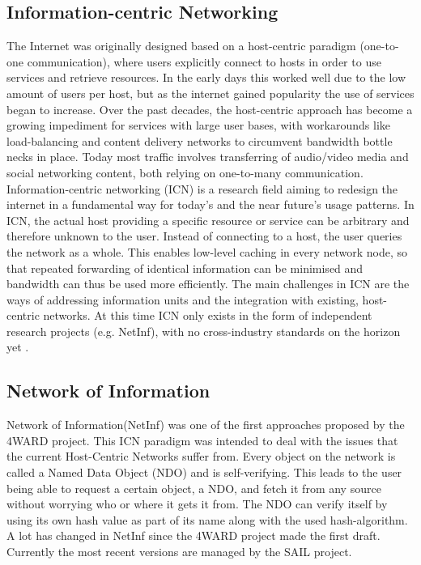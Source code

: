 \subsection{Information-centric Networking}
\label{sec:netinf}
The Internet was originally designed based on a host-centric paradigm 
(one-to-one communication), where users explicitly connect to hosts 
in order to use services and retrieve resources. In the early days 
this worked well due to the low amount of users per host, but as the 
internet gained popularity the use of services began to increase. 
Over the past decades, the host-centric approach has become a 
growing impediment for services with large user bases, with workarounds 
like load-balancing and content delivery networks to circumvent 
bandwidth bottle necks in place. Today most traffic involves 
transferring of audio/video media and social networking content,
 both relying on one-to-many communication. Information-centric
 networking (ICN) is a research field aiming to redesign the internet
 in a fundamental way for today's and the near future's usage patterns. 
In ICN, the actual host providing a specific resource or service can
 be arbitrary and therefore unknown to the user. Instead of connecting 
to a host, the user queries the network as a whole. This enables 
low-level caching in every network node, so that repeated forwarding 
of identical information can be minimised and bandwidth can thus be used more
 efficiently. The main challenges in ICN are the ways of addressing 
information units and the integration with existing, host-centric networks. 
At this time ICN only exists in the form of independent research projects 
(e.g. NetInf), with no cross-industry standards on the horizon
 yet \cite{ICNarticle}. 


\subsection{Network of Information}
Network of Information(NetInf) was one of the first approaches proposed 
by the 4WARD project. \cite{4ward} This ICN paradigm was intended to deal 
with the issues that the current Host-Centric Networks suffer from. Every 
object on the network is called a Named Data Object (NDO) and is self-verifying.
 This leads to the user being able to request a certain object, a NDO, 
and fetch it from any source without worrying who or where it gets it from.
 The NDO can verify itself by using its own hash value as part of its name
 along with the used hash-algorithm.
A lot has changed in NetInf since the 4WARD project made the first draft. 
Currently the most recent versions are managed by the SAIL project.
 \cite{sail}

